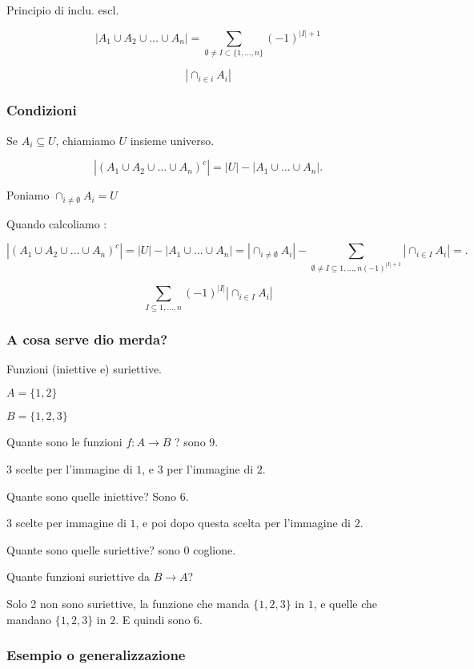\documentclass[11pt]{article}
\begin{document}
		Principio di inclu. escl.
		
		\[
		|A_1 \cup A_2 \cup \ldots \cup A_n| = 
		\sum_{\emptyset \neq I \subset \{1,\ldots,n\}} (-1)^{|I|+ 1}
		\] 
		
		\[
		|\cap_{i \in i} A_i|
		\]

		\subsubsection{Condizioni}

		Se $A_i \subseteq U$, chiamiamo $U$ insieme universo.
		
		\[
			|(A_1 \cup A_2 \cup \ldots \cup A_n)^{c}| = |U| - |A_1 \cup \ldots 
			\cup A_n|
		.\] 
		
		Poniamo $\cap_{i \neq \emptyset} A_i = U$

		Quando calcoliamo :

		\[
			|(A_1 \cup A_2 \cup \ldots \cup A_n)^{c}| = |U| - |A_1 \cup \ldots 
			\cup A_n|
			=
			|\cap_{i \neq \emptyset} A_i| - 
			\sum_{\emptyset \neq I \subseteq {1,\ldots,n} (-1)^{|I| + 1}}
			|\cap_{i \in I} A_i| =
		.\] 
			
		\[
			\sum_{I \subseteq {1,\ldots,n}} (-1)^{|I|}| \cap_{i \in I} A_i|
		\]

		\subsubsection{A cosa serve dio merda?}

		Funzioni (iniettive e) suriettive.

		$A = \{1,2\}$

		$B = \{1,2,3\}$

		Quante sono le funzioni  $f: A \to  B$ ? sono 9.

		$3$ scelte per l'immagine di $1$, e $3$ per l'immagine di $2$.

		Quante sono quelle iniettive? Sono 6.

		$3$ scelte per immagine di $1$, e poi dopo questa scelta per l'immagine
		di $2$.

		Quante sono quelle suriettive? sono 0 coglione.

		Quante funzioni suriettive da $B \to A$?
		
		Solo 2 non sono suriettive, la funzione che manda $\{1,2,3\}$ in $1$,
		e quelle che mandano $\{1,2,3\}$ in $2$. E quindi sono $6$.

		\subsubsection{Esempio o generalizzazione}
\end{document}
